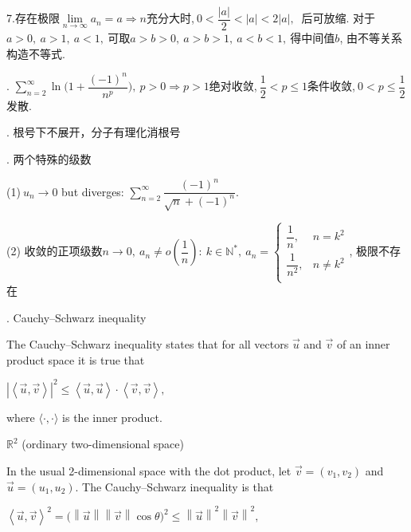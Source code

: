 \documentclass[UTF8]{ctexart}
\newcommand\no{\noindent}
\newcommand\dis{\displaystyle}
\newcommand\ls{\leqslant}
\newcommand\limn{\dis\lim\limits_{n\to\infty}}
\begin{document}
\begin{spacing}{2}
\no7.存在极限$\limn a_n=a\Longrightarrow n$充分大时,$\ 0<\dfrac{|a|}{2}<|a|<2|a|,\ $
后可放缩. 对于$a>0,\ a>1,\ a<1,\ $可取$a>b>0,\ a>b>1,\ a<b<1,\ $得中间值$b$, 由不等关系构造不等式.

\vspace{0.2cm}

\no8. $\dis\sum\limits_{n=2}^\infty\ln\Bigg(1+\dfrac{(-1)^n}{n^p}\Bigg),\ p>0
\Longrightarrow p>1$绝对收敛,$\ \dfrac{1}{2}<p\ls1$条件收敛,$\ 0<p\ls\dfrac{1}{2}$发散.

\vspace{0.2cm}

\no9. 根号下不展开，分子有理化消根号

\no10. 两个特殊的级数

(1)$\ u_n\to0$ but diverges: 
$\dis\sum\limits_{n=2}^\infty\dfrac{(-1)^n}{\sqrt{n}+(-1)^n}.$

(2) 收敛的正项级数$n\to0,\ a_n\neq o\left(\dfrac{1}{n}\right):\ k\in\mathbb{N}^*,\ 
a_n=\left\{\begin{array}{ll}
\dfrac{1}{n},&n=k^2\\
\dfrac{1}{n^2},&n\neq k^2\\
\end{array}\right.$, 极限不存在

\no11. \textcolor[rgb]{1,0,0}{Cauchy–Schwarz inequality}

The Cauchy–Schwarz inequality states that for all vectors $\stackrel{\rightarrow}{u}$ and $\stackrel{\rightarrow}{v}$ of an inner product space it is true that

\centerline{\textcolor[rgb]{0,0,1}{$\displaystyle \left|\left< \stackrel{\rightarrow}{u} ,\stackrel{\rightarrow}{v} \right> \right|^{2}\ls \left< \stackrel{\rightarrow}{u} ,\stackrel{\rightarrow}{u} \right> \cdot \left< \stackrel{\rightarrow}{v} ,\stackrel{\rightarrow}{v} \right> ,$}}

where $\displaystyle \langle \cdot ,\cdot \rangle $ is the inner product. 

\textcolor[rgb]{1,0,0}{$\mathbb{R}^2$ (ordinary two-dimensional space)}

In the usual 2-dimensional space with the dot product, let $\displaystyle \stackrel{\rightarrow}{v}=(v_{1},v_{2})$ and ${\displaystyle \stackrel{\rightarrow}{u}=(u_{1},u_{2})}$. The Cauchy–Schwarz inequality is that

\centerline{\textcolor[rgb]{0,0,1}{${\displaystyle \left< \stackrel{\rightarrow}{u},\stackrel{\rightarrow}{v}\right>^{2}=\Big(\left\|\stackrel{\rightarrow}{u}\right\|\left\|\stackrel{\rightarrow}{v}\right\|\cos \theta \Big)^{2}\ls \left\|\stackrel{\rightarrow}{u}\right\|^{2}\left\|\stackrel{\rightarrow}{v}\right\|^{2}} ,$}}


\end{spacing}
\end{document}
